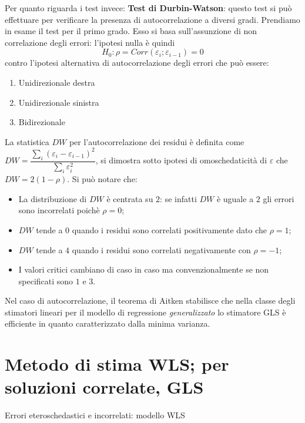 \documentclass[a4page, 11pt]{article} %
\begin{document}
Per quanto riguarda i test invece:
\newline
\textbf{Test di Durbin-Watson}: questo test si può effettuare per verificare la presenza di autocorrelazione a diversi gradi. 
Prendiamo in esame il test per il primo grado. Esso si basa sull’assunzione di non correlazione degli errori: l’ipotesi nulla è quindi \begin{equation*}
H_0:  \rho = Corr( \varepsilon_i  ;\varepsilon_{i-1} )=0
\end{equation*}
contro l’ipotesi alternativa di autocorrelazione degli errori che può essere:
\begin{enumerate}[noitemsep]
\item Unidirezionale destra
\item Unidirezionale sinistra
\item Bidirezionale	
\end{enumerate}

La statistica $DW$ per l'autocorrelazione dei residui è definita come $DW=\dfrac{\sum_{i} (\varepsilon_i - \varepsilon_{i-1})^2}{\sum_{i} \varepsilon_i^2}$, si dimostra sotto ipotesi di omoschedaticità di $\varepsilon$ che $DW = 2(1-\rho)$. Si può notare che: 
\begin{itemize}[noitemsep]
\item La distribuzione di $DW$ è centrata su $2$: se infatti $DW$ è uguale a $2$ gli errori sono incorrelati poichè $\rho = 0$; 
\item $DW$ tende a $0$ quando i residui sono correlati positivamente dato che $\rho = 1$;
\item $DW$ tende a $4$ quando i residui sono correlati negativamente con $\rho = -1$; 
\item I valori critici cambiano di caso in caso ma convenzionalmente se non specificati sono $1$ e $3$. 

\end{itemize}
Nel caso di autocorrelazione, il teorema di Aitken stabilisce che nella classe degli stimatori lineari per il modello di regressione \textit{generalizzato} lo stimatore GLS è efficiente in quanto caratterizzato dalla minima varianza. 


\section{Metodo di stima WLS; per soluzioni correlate, GLS }

\begin{itshape}
Errori eteroschedastici e incorrelati: modello WLS
\end{itshape}%
\end{document}
